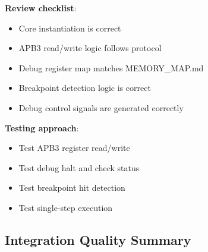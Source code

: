 \begin{record}

\textbf{Review checklist}:

\begin{itemize}
\tightlist
\item[$\square$]
  Core instantiation is correct
\item[$\square$]
  APB3 read/\allowbreak{}write logic follows protocol
\item[$\square$]
  Debug register map matches MEMORY\_\allowbreak{}MAP.md
\item[$\square$]
  Breakpoint detection logic is correct
\item[$\square$]
  Debug control signals are generated correctly
\end{itemize}

\textbf{Testing approach}:

\begin{itemize}
\tightlist
\item
  Test APB3 register read/\allowbreak{}write
\item
  Test debug halt and check status
\item
  Test breakpoint hit detection
\item
  Test single-step execution
\end{itemize}

\end{record}

\subsection{Integration Quality Summary}\label{cr:fix:cpu-integration-summary:integration-quality-summary}

